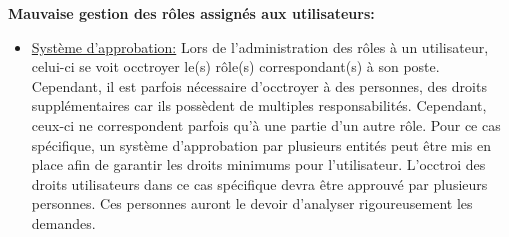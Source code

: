 \documentclass[12pt]{article}
\begin{document}
\textbf{Mauvaise gestion des rôles assignés aux utilisateurs:} 
\justify
\begin{itemize} 
	\item \underline{Système d'approbation:} Lors de l'administration des rôles à un utilisateur, celui-ci se voit occtroyer le(s) rôle(s) correspondant(s) à son poste. Cependant, il est parfois nécessaire d'occtroyer à des personnes, des droits supplémentaires car ils possèdent de multiples responsabilités. Cependant, ceux-ci ne correspondent parfois qu'à une partie d'un autre rôle. Pour ce cas spécifique, un système d'approbation par plusieurs entités peut être mis en place afin de garantir les droits minimums pour l'utilisateur. L'occtroi des droits utilisateurs dans ce cas spécifique devra être approuvé par plusieurs personnes. Ces personnes auront le devoir d'analyser rigoureusement les demandes.
\end{itemize}

\justify
\end{document}
